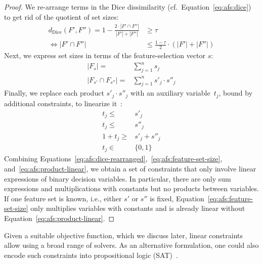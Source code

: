 \documentclass{article}
\theoremstyle{definition}
\begin{document}
\begin{proof}
We re-arrange terms in the Dice dissimilarity (cf.~Equation~\ref{eq:afs:dice}) to get rid of the quotient of set sizes:
%
\begin{equation}
	\begin{aligned}
		d_{\text{Dice}}(F',F'') = 1 - \frac{2 \cdot |F' \cap F''|}{|F'| + |F''|} &\geq \tau \\
		\Leftrightarrow |F' \cap F''| &\leq \frac{1 - \tau}{2} \cdot (|F'| + |F''|)
	\end{aligned}
	\label{eq:afs:dice-rearranged}
\end{equation}
%
Next, we express set sizes in terms of the feature-selection vector $s$:
%
\begin{equation}
	\begin{aligned}
		|F_s| =& \sum_{j=1}^n s_j \\
		|F_{s'} \cap F_{s''}| =& \sum_{j=1}^n s'_j \cdot s''_j
	\end{aligned}
	\label{eq:afs:feature-set-size}
\end{equation}
%
Finally, we replace each product $s'_j \cdot s''_j$ with an auxiliary variable~$t_j$, bound by additional constraints, to linearize it~\cite{mosek2022modeling}:
%
\begin{equation}
	\begin{aligned}
		t_j \leq& s'_j \\
		t_j \leq& s''_j \\
		1 + t_j \geq& s'_j + s''_j \\
		t_j \in& \{0,1\}
	\end{aligned}
	\label{eq:afs:product-linear}
\end{equation}
%
Combining Equations~\ref{eq:afs:dice-rearranged},~\ref{eq:afs:feature-set-size}, and~\ref{eq:afs:product-linear}, we obtain a set of constraints that only involve linear expressions of binary decision variables.
In particular, there are only sum expressions and multiplications with constants but no products between variables.
If one feature set is known, i.e., either $s'$ or $s''$ is fixed, Equation~\ref{eq:afs:feature-set-size} only multiplies variables with constants and is already linear without Equation~\ref{eq:afs:product-linear}.
\end{proof}
%
Given a suitable objective function, which we discuss later, linear constraints allow using a broad range of solvers.
As an alternative formulation, one could also encode such constraints into propositional logic (\textsc{SAT})~\cite{ulrich2022selecting}.
\end{document}
